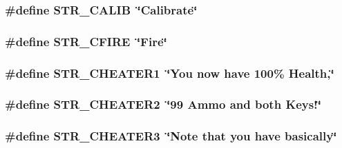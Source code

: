 \label{FOREIGN_8H_ad016869b8e988020793c6648820cb7b2}
\hypertarget{FOREIGN_8H_a2266071ac777f6d76dbcde7e4e48c5dd}{
\subsubsection[{STR\_\-CALIB}]{\setlength{\rightskip}{0pt plus 5cm}\#define STR\_\-CALIB~\char`\"{}Calibrate\char`\"{}}}
\label{FOREIGN_8H_a2266071ac777f6d76dbcde7e4e48c5dd}
\hypertarget{FOREIGN_8H_aa2c585b9e1da9f146cac7af9e5981d09}{
\subsubsection[{STR\_\-CFIRE}]{\setlength{\rightskip}{0pt plus 5cm}\#define STR\_\-CFIRE~\char`\"{}Fire\char`\"{}}}
\label{FOREIGN_8H_aa2c585b9e1da9f146cac7af9e5981d09}
\hypertarget{FOREIGN_8H_ab1be9c9331209b53ff85b5f8ee223cd4}{
\subsubsection[{STR\_\-CHEATER1}]{\setlength{\rightskip}{0pt plus 5cm}\#define STR\_\-CHEATER1~\char`\"{}You now have 100\% Health,\char`\"{}}}
\label{FOREIGN_8H_ab1be9c9331209b53ff85b5f8ee223cd4}
\hypertarget{FOREIGN_8H_a4c008f449f124be04de3ab1a9c850009}{
\subsubsection[{STR\_\-CHEATER2}]{\setlength{\rightskip}{0pt plus 5cm}\#define STR\_\-CHEATER2~\char`\"{}99 Ammo and both Keys!\char`\"{}}}
\label{FOREIGN_8H_a4c008f449f124be04de3ab1a9c850009}
\hypertarget{FOREIGN_8H_a9b0cd198a6495bd0e515f7766192b57f}{
\subsubsection[{STR\_\-CHEATER3}]{\setlength{\rightskip}{0pt plus 5cm}\#define STR\_\-CHEATER3~\char`\"{}Note that you have basically\char`\"{}}}
